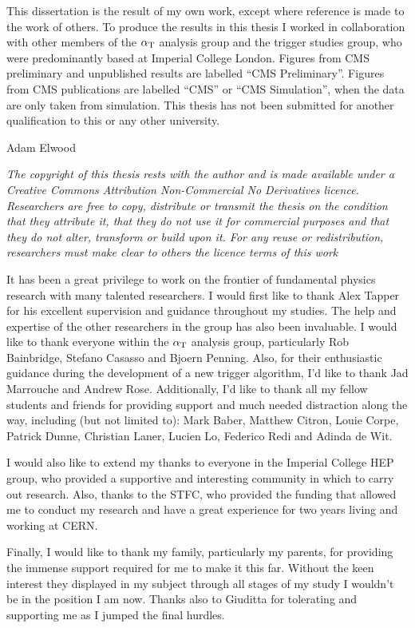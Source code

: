 \begin{declaration}
  This dissertation is the result of my own work, except where
  reference is made to the work of others. To produce the
  results in this thesis I worked in collaboration with other members of
  the $\alpha_{\text{T}}$ analysis group and the trigger studies group, who were
  predominantly based at Imperial College London. Figures from CMS
  preliminary and unpublished results are labelled ``CMS
  Preliminary''. Figures from CMS publications are labelled ``CMS'' or
  ``CMS Simulation'', when the data are only taken from simulation. This
  thesis has not been submitted for another qualification to this or
  any other university. 
  \vspace*{1cm}
  \begin{flushright}
    Adam Elwood
  \end{flushright}
  \vspace*{1cm}
  {\it The copyright of this thesis rests with the author and is made
  available under a Creative Commons Attribution Non-Commercial No
  Derivatives licence. Researchers are free to copy, distribute or
  transmit the thesis on the condition that they attribute it, that
  they do
  not use it for commercial purposes and that they do not alter,
  transform or build upon it. For any reuse or redistribution,
  researchers must make clear to others the licence terms of this
  work}
\end{declaration}


\begin{acknowledgements}
It has been a great privilege to work on the frontier of fundamental
physics research with many talented researchers. I would first like to
thank Alex Tapper for his excellent supervision and guidance
throughout my studies. The help and expertise of the
other researchers in the group has also been invaluable. I would like to
thank everyone within the $\alpha_{\text{T}}$ analysis group, particularly Rob
Bainbridge, Stefano Casasso and Bjoern Penning. Also, for their enthusiastic
guidance during the development of a new trigger algorithm, I'd like to
thank Jad Marrouche and Andrew Rose. Additionally, I'd like to thank
all my fellow students and friends for providing support and much
needed distraction along the way, including (but not limited to): Mark
Baber, Matthew Citron, Louie Corpe, Patrick Dunne, Christian Laner,
Lucien Lo, Federico Redi and Adinda de Wit.

I would also like to extend my thanks to everyone in the Imperial
College HEP group, who provided a supportive and interesting community
in which to carry out research. Also, thanks to the STFC,
who provided the funding that allowed me to conduct my research and
have a great experience for two years living and working at CERN.

Finally, I would like to thank my family, particularly my parents, for
providing the immense support required for me to make it this far.
Without the keen interest they displayed in my subject through all
stages of my study I wouldn't be in the position I am now. Thanks
also to Giuditta for tolerating and supporting me as I jumped the
final hurdles.
\end{acknowledgements}


